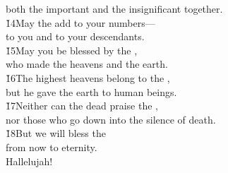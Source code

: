 \begin{poetry}
\poemll    both the important and the insignificant together. \\
\poeml \v{14}May the  add to your numbers--- \\
\poemll    to you and to your descendants. \\
\poeml \v{15}May you be blessed by the , \\
\poemll    who made the heavens and the earth. \\
\poeml \v{16}The highest heavens belong to the , \\
\poemll    but he gave the earth to human beings. \\
\poeml \v{17}Neither can the dead praise the , \\
\poemll    nor those who go down into the silence of death. \\
\poeml \v{18}But we will bless the  \\
\poemll    from now to eternity. \\
\poeml Hallelujah!
\end{poetry}

